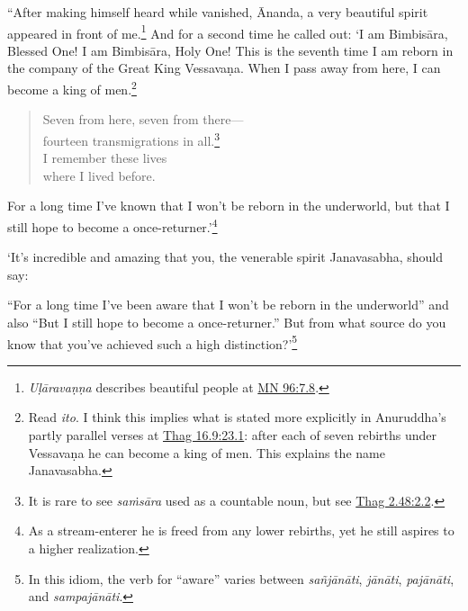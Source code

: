 \documentclass[12pt,openany]{book}%
\begin{document}
“After making himself heard while vanished, Ānanda, a very beautiful spirit appeared in front of me.\footnote{\textit{\textsanskrit{Uḷāravaṇṇa}} describes beautiful people at \href{https://suttacentral.net/mn96/en/sujato\#7.8}{MN 96:7.8}. } And for a second time he called out: ‘I am \textsanskrit{Bimbisāra}, Blessed One! I am \textsanskrit{Bimbisāra}, Holy One! This is the seventh time I am reborn in the company of the Great King \textsanskrit{Vessavaṇa}. When I pass away from here, I can become a king of men.\footnote{Read \textit{ito}. I think this implies what is stated more explicitly in Anuruddha’s partly parallel verses at \href{https://suttacentral.net/thag16.9/en/sujato\#23.1}{Thag 16.9:23.1}: after each of seven rebirths under \textsanskrit{Vessavaṇa} he can become a king of men. This explains the name Janavasabha. } 

\begin{verse}%
Seven from here, seven from there—\\
fourteen transmigrations in all.\footnote{It is rare to see \textit{\textsanskrit{saṁsāra}} used as a countable noun, but see \href{https://suttacentral.net/thag2.48/en/sujato\#2.2}{Thag 2.48:2.2}. } \\
I remember these lives \\
where I lived before. 

%
\end{verse}

For a long time I’ve known that I won’t be reborn in the underworld, but that I still hope to become a once-returner.’\footnote{As a stream-enterer he is freed from any lower rebirths, yet he still aspires to a higher realization. } 

‘It’s incredible and amazing that you, the venerable spirit Janavasabha, should say: 

“For a long time I’ve been aware that I won’t be reborn in the underworld” and also “But I still hope to become a once-returner.” But from what source do you know that you’ve achieved such a high distinction?’\footnote{In this idiom, the verb for “aware” varies between \textit{\textsanskrit{sañjānāti}}, \textit{\textsanskrit{jānāti}}, \textit{\textsanskrit{pajānāti}}, and \textit{\textsanskrit{sampajānāti}}. } 
\end{document}
